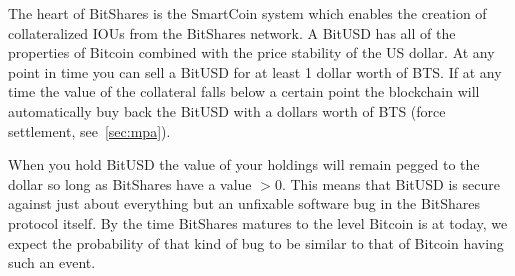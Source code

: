 The heart of BitShares is the SmartCoin system which enables the creation of
collateralized IOUs from the BitShares network. A BitUSD has all of the
properties of Bitcoin combined with the price stability of the US dollar. At
any point in time you can sell a BitUSD for at least 1 dollar worth of BTS. If
at any time the value of the collateral falls below a certain point the
blockchain will automatically buy back the BitUSD with a dollars worth of BTS
(force settlement, see~\cref{sec:mpa}).

When you hold BitUSD the value of your holdings will remain pegged to the
dollar so long as BitShares have a value $>0$. This means that BitUSD is secure
against just about everything but an unfixable software bug in the BitShares
protocol itself. By the time BitShares matures to the level Bitcoin is at
today, we expect the probability of that kind of bug to be similar to that of
Bitcoin having such an event.
